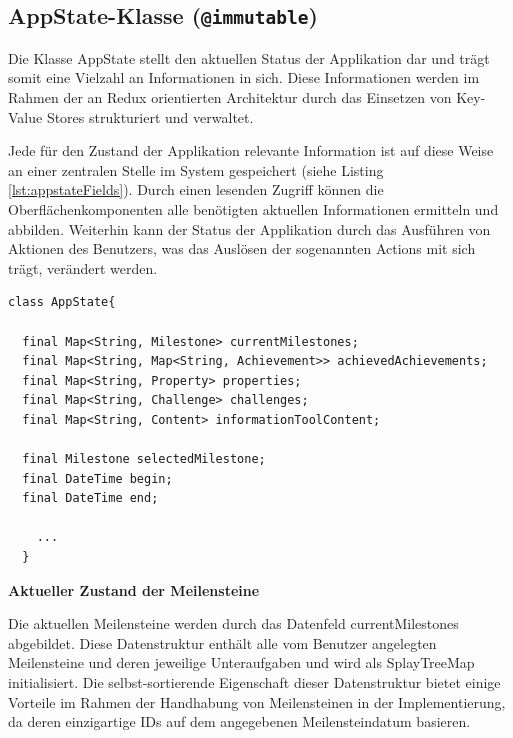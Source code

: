 \documentclass[bibliography=totoc,listof=totoc,BCOR=5mm,DIV=12,oneside]{scrbook}
\begin{document}
{\subsection{AppState-Klasse (\texttt{@immutable})}
\par Die Klasse AppState stellt den aktuellen Status der Applikation dar und trägt somit eine Vielzahl an Informationen in sich. Diese Informationen werden im Rahmen der an Redux orientierten Architektur durch das Einsetzen von Key-Value Stores strukturiert und verwaltet. 

\par \medskip Jede für den Zustand der Applikation relevante Information ist auf diese Weise an einer zentralen Stelle im System gespeichert (siehe Listing \ref{lst:appstateFields}). Durch einen lesenden Zugriff können die Oberflächenkomponenten alle benötigten aktuellen Informationen ermitteln und abbilden. Weiterhin kann der Status der Applikation durch das Ausführen von Aktionen des Benutzers, was das Auslösen der sogenannten Actions mit sich trägt, verändert werden.
  
  \bigskip
 \begin{lstlisting}[caption={Datenfelder der AppState-Klasse},captionpos=b, label=lst:appstateFields]
class AppState{

  final Map<String, Milestone> currentMilestones;
  final Map<String, Map<String, Achievement>> achievedAchievements;
  final Map<String, Property> properties;
  final Map<String, Challenge> challenges;
  final Map<String, Content> informationToolContent; 
 
  final Milestone selectedMilestone;
  final DateTime begin;
  final DateTime end;

	...
  }
\end{lstlisting}
\bigskip



\par \bigskip \textbf{Aktueller Zustand der Meilensteine}
\par Die aktuellen Meilensteine werden durch das Datenfeld currentMilestones abgebildet. Diese Datenstruktur enthält alle vom Benutzer angelegten Meilensteine und deren jeweilige Unteraufgaben und wird als SplayTreeMap initialisiert. Die selbst-sortierende Eigenschaft dieser Datenstruktur bietet einige Vorteile im Rahmen der Handhabung von Meilensteinen in der Implementierung, da deren einzigartige IDs auf dem angegebenen Meilensteindatum basieren.

}
\end{document}
